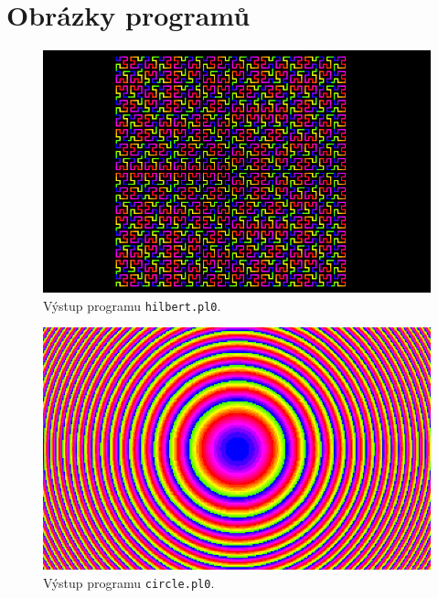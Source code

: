 \documentclass[a4paper]{article}
\begin{document}
\section{Obr\'azky program\r{u}}\label{app:obr}
\begin{figure}[!ht]
	\centering
	\includegraphics[width=.8\textwidth]{../pictures/hilbert.png}
	\caption{V\'ystup programu \texttt{hilbert.pl0}.}
	\label{obr:hilbert}
\end{figure}
\begin{figure}[!ht]
	\centering
	\includegraphics[width=.8\textwidth]{../pictures/circle.png}
	\caption{V\'ystup programu \texttt{circle.pl0}.}
	\label{obr:circle}
\end{figure}
\clearpage
\end{document}
